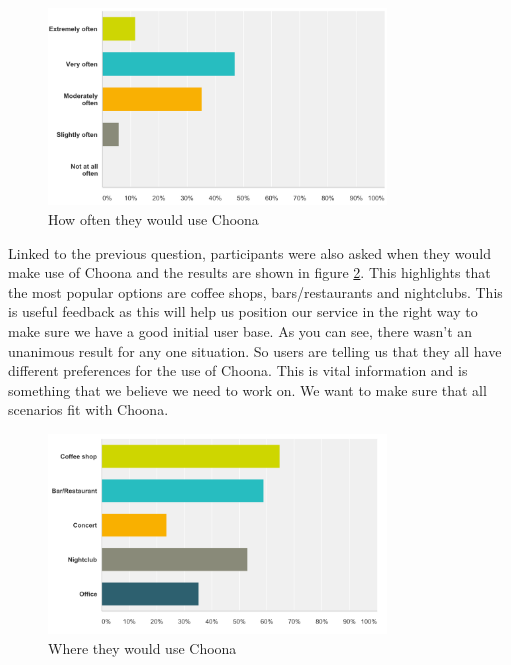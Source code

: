     \begin{figure}[h!]
      \centering
      \includegraphics[width=0.8\textwidth]{./img/how_often.png}
      \caption{How often they would use Choona}
      \label{fig:how_often}
    \end{figure}

Linked to the previous question, participants were also asked when they would make use of Choona and the results are shown in figure \ref{fig:where}.  This highlights that the most popular options are coffee shops, bars/restaurants and nightclubs.  This is useful feedback as this will help us position our service in the right way to make sure we have a good initial user base.  As you can see, there wasn't an unanimous result for any one situation.  So users are telling us that they all have different preferences for the use of Choona.  This is vital information and is something that we believe we need to work on.  We want to make sure that all scenarios fit with Choona.  \\

    \begin{figure}[h!]
      \centering
      \includegraphics[width=0.8\textwidth]{./img/use_situation.png}
      \caption{Where they would use Choona}
      \label{fig:where}
    \end{figure}


